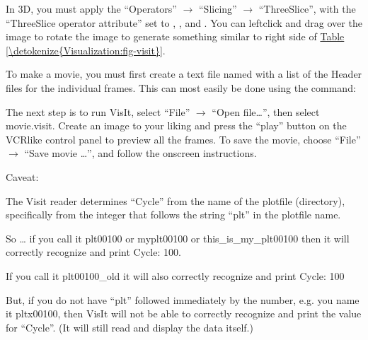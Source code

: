 \documentclass[letterpaper,10pt,english]{sphinxmanual}
\begin{document}
\sphinxAtStartPar
In 3D, you must apply the “Operators” \(\rightarrow\) “Slicing”
\(\rightarrow\) “ThreeSlice”, with the “ThreeSlice operator attribute” set
to , , and . You can left\sphinxhyphen{}click and drag over the
image to rotate the image to generate something similar to right side of
\hyperref[\detokenize{Visualization:fig-visit}]{Table \ref{\detokenize{Visualization:fig-visit}}}.

\sphinxAtStartPar
To make a movie, you must first create a text file named  with a
list of the Header files for the individual frames. This can most easily be
done using the command:

\begin{sphinxVerbatim}[commandchars=\\\{\}]
\end{sphinxVerbatim}

\sphinxAtStartPar
The next step is to run VisIt, select “File” \(\rightarrow\) “Open file…”,
then select movie.visit. Create an image to your liking and press the
“play”  button on the VCR\sphinxhyphen{}like control panel to preview all the frames. To save
the movie, choose “File” \(\rightarrow\) “Save movie …”, and follow the
on\sphinxhyphen{}screen instructions.

\sphinxAtStartPar
Caveat:

\sphinxAtStartPar
The Visit reader determines “Cycle” from the name of the plotfile (directory),
specifically from the integer that follows the string “plt” in the plotfile name.

\sphinxAtStartPar
So … if you call it plt00100 or myplt00100 or this\_is\_my\_plt00100 then it will
correctly recognize and print Cycle: 100.

\sphinxAtStartPar
If you call it plt00100\_old it will also correctly recognize and print Cycle: 100

\sphinxAtStartPar
But, if you do not have “plt” followed immediately by the number,
e.g. you name it pltx00100, then VisIt will not be able to correctly recognize
and print the value for “Cycle”.  (It will still read and display the data itself.)
\end{document}
